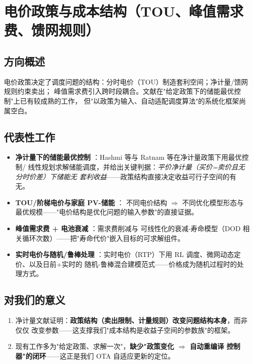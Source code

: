 \documentclass[10pt, twocolumn]{article}
\begin{document}
\section{电价政策与成本结构（TOU、峰值需求费、馈网规则）}\label{sec:tariff}

\subsection{方向概述}
电价政策决定了调度问题的结构：分时电价（TOU）制造套利空间；净计量/馈网规则约束卖出；
峰值需求费引入跨时段耦合。文献在"给定政策下的储能最优控制"上已有较成熟的工作，
但"以政策为输入、自动适配调度算法"的系统化框架尚属空白。

\subsection{代表性工作}
\begin{itemize}
\item \textbf{净计量下的储能最优控制} \cite{hashmi_netmetering_control,
hashmi_netmetering_lp, ratnam_netmetering}：Hashmi 等与 Ratnam 等在净计量政策下用最优控制/
线性规划求解储能调度，并给出关键判据：\emph{平价净计量（买价=卖价且无分时价差）下储能无
套利收益}——政策结构直接决定收益可行子空间的有无。
\item \textbf{TOU/阶梯电价与家庭 PV-储能} \cite{zhang_tou_step, babu_netmetering_tou_solar}：
不同电价结构 $\Rightarrow$ 不同优化模型形态与最优规模——"电价结构是优化问题的输入参数"的直接证据。
\item \textbf{峰值需求费 + 电池衰减} \cite{vatanparvar_demand_charge,
hou_degradation_linear, battery_degradation_scheduling, degradation_market}：需求费削减与
可线性化的衰减-寿命模型（DOD 相关循环次数）——把"寿命代价"嵌入目标的可求解组件。
\item \textbf{实时电价与随机/鲁棒处理} \cite{rl_storage_rtp, dynamic_pricing_microgrid,
akbari_stoch_robust}：实时电价（RTP）下用 RL 调度、微网动态定价、以及日前+实时的
随机-鲁棒混合建模范式——价格成为随机过程时的处理方式。
\end{itemize}

\subsection{对我们的意义}
\begin{enumerate}
\item 净计量文献证明：\textbf{政策结构（卖出限制、计量规则）改变问题结构本身}，而非仅仅
改变参数——这支撑我们"成本结构是收益子空间的参数族"的框架。
\item 现有工作多为"给定政策、求解一次"，\textbf{缺少"政策变化 $\Rightarrow$ 自动重编译
控制器"的闭环}——这正是我们 OTA 自适应更新的定位。
\end{enumerate}
\end{document}
